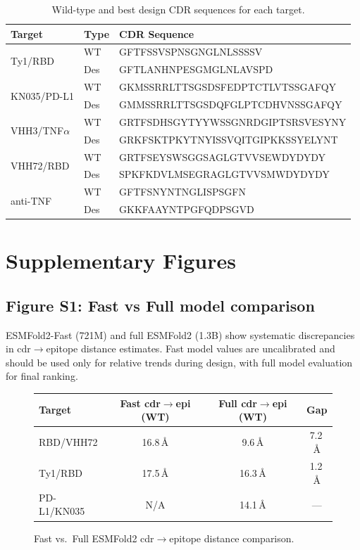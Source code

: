 \documentclass{nature}
\begin{document}
\begin{table}[htbp]
\centering
\caption{Wild-type and best design CDR sequences for each target.}
\begin{tabular}{llp{8cm}}
\toprule
Target & Type & CDR Sequence \\
\midrule
\multirow{2}{*}{Ty1/RBD} & WT  & GFTFSSVSPNSGNGLNLSSSSV \\
                         & Des & GFTLANHNPESGMGLNLAVSPD \\
\midrule
\multirow{2}{*}{KN035/PD-L1} & WT  & GKMSSRRLTTSGSDSFEDPTCTLVTSSGAFQY \\
                             & Des & GMMSSRRLTTSGSDQFGLPTCDHVNSSGAFQY \\
\midrule
\multirow{2}{*}{VHH3/TNF$\alpha$} & WT  & GRTFSDHSGYTYYWSSGNRDGIPTSRSVESYNY \\
                                  & Des & GRKFSKTPKYTNYISSVQITGIPKKSSYELYNT \\
\midrule
\multirow{2}{*}{VHH72/RBD} & WT  & GRTFSEYSWSGGSAGLGTVVSEWDYDYDY \\
                           & Des & SPKFKDVLMSEGRAGLGTVVSMWDYDYDY \\
\midrule
\multirow{2}{*}{anti-TNF} & WT  & GFTFSNYNTNGLISPSGFN \\
                          & Des & GKKFAAYNTPGFQDPSGVD \\
\bottomrule
\end{tabular}
\end{table}

\section{Supplementary Figures}

\subsection{Figure S1: Fast vs Full model comparison}

ESMFold2-Fast (721M) and full ESMFold2 (1.3B) show systematic discrepancies in cdr$\to$epitope distance estimates. Fast model values are uncalibrated and should be used only for relative trends during design, with full model evaluation for final ranking.

\begin{figure}[htbp]
\centering
\begin{tabular}{lccc}
\toprule
Target & Fast cdr$\to$epi (WT) & Full cdr$\to$epi (WT) & Gap \\
\midrule
RBD/VHH72  & 16.8\,\AA & 9.6\,\AA  & 7.2\,\AA \\
Ty1/RBD    & 17.5\,\AA & 16.3\,\AA & 1.2\,\AA \\
PD-L1/KN035 & N/A     & 14.1\,\AA & --- \\
\bottomrule
\end{tabular}
\caption{Fast vs.\ Full ESMFold2 cdr$\to$epitope distance comparison.}
\end{figure}
\end{document}
